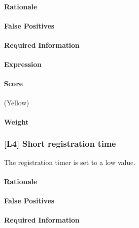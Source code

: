 \documentclass[a4paper,11pt,notitlepage,bigheadings,oneside]{scrartcl}
\begin{document}
\paragraph{Rationale}

\TBD{}

\paragraph{False Positives}

\TBD{}

\paragraph{Required Information}

\TBD{}

\paragraph{Expression}

\TBD{}

\paragraph{Score}

\TBD{} (Yellow)

\paragraph{Weight}

\TBD{}

\subsubsection{[L4] Short registration time}

The registration timer is set to a low value.

\paragraph{Rationale}

\TBD{}

\paragraph{False Positives}

\TBD{}

\paragraph{Required Information}
\end{document}
